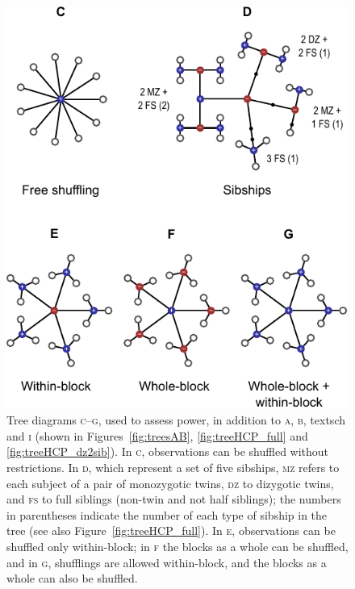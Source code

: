 \begin{figure}[!tp]
\centering
\hspace*{0cm}\includegraphics{figures/treesCG.pdf}
\vspace{1cm}
\caption{Tree diagrams \textsc{c}--\textsc{g}, used to assess power, in addition to \textsc{a}, \textsc{b}, textsc{h} and \textsc{i} (shown in Figures~\ref{fig:treesAB}, \ref{fig:treeHCP_full} and \ref{fig:treeHCP_dz2sib}). In \textsc{c}, observations can be shuffled without restrictions. In \textsc{d}, which represent a set of five sibships, \textsc{mz} refers to each subject of a pair of monozygotic twins, \textsc{dz} to dizygotic twins, and \textsc{fs} to full siblings (non-twin and not half siblings); the numbers in parentheses indicate the number of each type of sibship in the tree (see also Figure~\ref{fig:treeHCP_full}). In \textsc{e}, observations can be shuffled only within-block; in \textsc{f} the blocks as a whole can be shuffled, and in \textsc{g}, shufflings are allowed within-block, and the blocks as a whole can also be shuffled.}
\label{fig:treesCG}
\end{figure}

